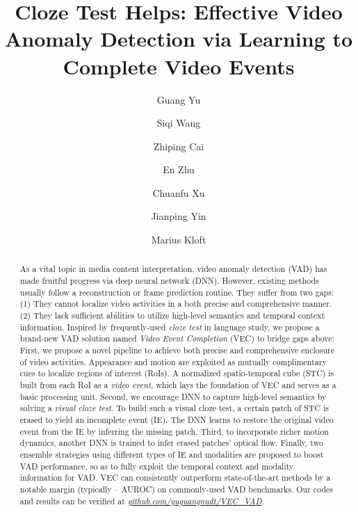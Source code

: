 \documentclass[sigconf]{acmart}
\begin{document}
	\fancyhead{}
	
	\title{Cloze Test Helps: Effective Video Anomaly Detection via Learning to Complete Video Events}

\author{Guang Yu}
\author{Siqi Wang}
\authornotemark[1]

\author{Zhiping Cai}

\author{En Zhu}

\author{Chuanfu Xu}

\author{Jianping Yin}

\author{Marius Kloft}

\renewcommand{\shortauthors}{Yu and Wang, et al.}

\begin{abstract}
	As a vital topic in media content interpretation, video anomaly detection (VAD) has made fruitful progress via deep neural network (DNN). However, existing methods usually follow a reconstruction or frame prediction routine. They suffer from two gaps: (1) They cannot localize video activities in a both precise and comprehensive manner. (2) They lack sufficient abilities to utilize high-level semantics and temporal context information. Inspired by frequently-used \textit{cloze test} in language study, we propose a brand-new VAD solution named \textit{Video Event Completion} (VEC) to bridge gaps above: First, we propose a novel pipeline to achieve both precise and comprehensive enclosure of video activities. Appearance and motion are exploited as mutually complimentary cues to localize regions of interest (RoIs). A normalized spatio-temporal cube (STC) is built from each RoI as a \textit{video event}, which lays the foundation of VEC and serves as a basic processing unit. Second, we encourage DNN to capture high-level semantics by solving a \textit{visual cloze test}. To build such a visual cloze test, a certain patch of STC is erased to yield an incomplete event (IE). The DNN learns to restore the original video event from the IE by inferring the missing patch. Third, to incorporate richer motion dynamics, another DNN is trained to infer erased patches' optical flow. Finally, two ensemble strategies using different types of IE and modalities are proposed to boost VAD performance, so as to fully exploit the temporal context and modality information for VAD. VEC can consistently outperform state-of-the-art methods by a notable margin (typically -- AUROC) on commonly-used VAD benchmarks. Our codes and results can be verified at \textit{\url{github.com/yuguangnudt/VEC_VAD}}.
\end{abstract}
\end{document}
